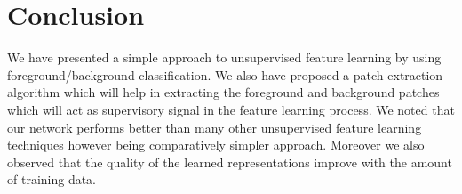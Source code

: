 \documentclass[10pt,twocolumn,letterpaper]{article}
\begin{document}
\section{Conclusion}
We have presented a simple approach to unsupervised feature learning by using foreground/background classification. We also have proposed a patch extraction algorithm which will help in extracting the foreground and background patches which will act as supervisory signal in the feature learning process. We noted that our network performs better than many other unsupervised feature learning techniques however being comparatively simpler approach. Moreover we also observed that the quality of the learned representations improve with the amount of training data.

{\small


}
\end{document}
